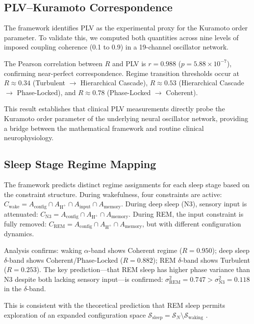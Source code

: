 \documentclass[twocolumn,10pt]{article}
\newcommand{\Hplus}{\mathrm{H}^{+}}
\newcommand{\Rorder}{R}
\begin{document}
\subsection{PLV--Kuramoto Correspondence}

The framework identifies PLV as the experimental proxy for the Kuramoto order parameter.  To validate this, we computed both quantities across nine levels of imposed coupling coherence (0.1 to 0.9) in a 19-channel oscillator network.

The Pearson correlation between $\Rorder$ and PLV is $r = 0.988$ ($p = 5.88 \times 10^{-7}$), confirming near-perfect correspondence.  Regime transition thresholds occur at $\Rorder \approx 0.34$ (Turbulent $\to$ Hierarchical Cascade), $\Rorder \approx 0.53$ (Hierarchical Cascade $\to$ Phase-Locked), and $\Rorder \approx 0.78$ (Phase-Locked $\to$ Coherent).

This result establishes that clinical PLV measurements \citep{lachaux1999measuring} directly probe the Kuramoto order parameter of the underlying neural oscillator network, providing a bridge between the mathematical framework and routine clinical neurophysiology.

\subsection{Sleep Stage Regime Mapping}

The framework predicts distinct regime assignments for each sleep stage based on the constraint structure.  During wakefulness, four constraints are active: $C_{\mathrm{wake}} = A_{\mathrm{config}} \cap A_{\Hplus} \cap A_{\mathrm{input}} \cap A_{\mathrm{memory}}$.  During deep sleep (N3), sensory input is attenuated: $C_{\mathrm{N3}} = A_{\mathrm{config}} \cap A_{\Hplus} \cap A_{\mathrm{memory}}$.  During REM, the input constraint is fully removed: $C_{\mathrm{REM}} = A_{\mathrm{config}} \cap A_{\Hplus} \cap A_{\mathrm{memory}}$, but with different configuration dynamics.

Analysis confirms: waking $\alpha$-band shows Coherent regime ($\Rorder = 0.950$); deep sleep $\delta$-band shows Coherent/Phase-Locked ($\Rorder = 0.882$); REM $\delta$-band shows Turbulent ($\Rorder = 0.253$).  The key prediction---that REM sleep has higher phase variance than N3 despite both lacking sensory input---is confirmed: $\sigma^{2}_{\mathrm{REM}} = 0.747 > \sigma^{2}_{\mathrm{N3}} = 0.118$ in the $\delta$-band.

This is consistent with the theoretical prediction that REM sleep permits exploration of an expanded configuration space $\mathcal{S}_{\mathrm{sleep}} = \mathcal{S}_{N} \setminus \mathcal{S}_{\mathrm{waking}}$ \citep{diekelmann2010memory, steriade2003neuronal}.
\end{document}
